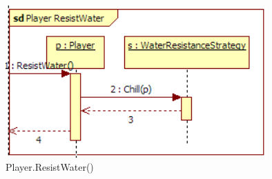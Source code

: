 \begin{figure}[H]
	\begin{center}
		\includegraphics[width=10cm]{chapters/chapter03/seqdiag/Player_ResistWater.png}
		\caption{Player.ResistWater()}
		\label{fig:PlayerResistWater}
	\end{center}
\end{figure}





